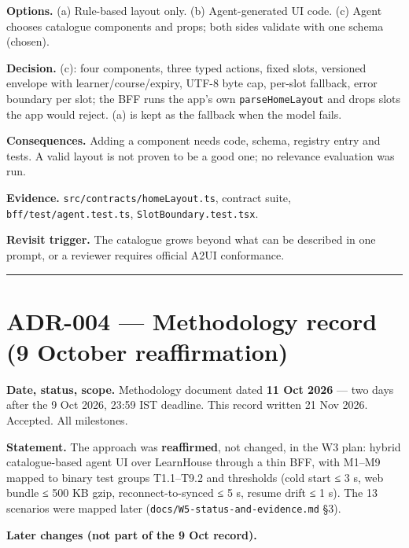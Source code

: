 \documentclass[
  11pt,
]{article}
\begin{document}
\textbf{Options.} (a) Rule-based layout only. (b) Agent-generated UI
code. (c) Agent chooses catalogue components and props; both sides
validate with one schema (chosen).

\textbf{Decision.} (c): four components, three typed actions, fixed
slots, versioned envelope with learner/course/expiry, UTF-8 byte cap,
per-slot fallback, error boundary per slot; the BFF runs the app's own
\texttt{parseHomeLayout} and drops slots the app would reject. (a) is
kept as the fallback when the model fails.

\textbf{Consequences.} Adding a component needs code, schema, registry
entry and tests. A valid layout is not proven to be a good one; no
relevance evaluation was run.

\textbf{Evidence.} \texttt{src/contracts/homeLayout.ts}, contract suite,
\texttt{bff/test/agent.test.ts}, \texttt{SlotBoundary.test.tsx}.

\textbf{Revisit trigger.} The catalogue grows beyond what can be
described in one prompt, or a reviewer requires official A2UI
conformance.

\begin{center}\rule{0.5\linewidth}{0.5pt}\end{center}

\hypertarget{adr-004-methodology-record-9-october-reaffirmation}{%
\section{ADR-004 --- Methodology record (9 October
reaffirmation)}\label{adr-004-methodology-record-9-october-reaffirmation}}

\textbf{Date, status, scope.} Methodology document dated \textbf{11 Oct
2026} --- two days after the 9 Oct 2026, 23:59 IST deadline. This record
written 21 Nov 2026. Accepted. All milestones.

\textbf{Statement.} The approach was \textbf{reaffirmed}, not changed,
in the W3 plan: hybrid catalogue-based agent UI over LearnHouse through
a thin BFF, with M1--M9 mapped to binary test groups T1.1--T9.2 and
thresholds (cold start ≤ 3 s, web bundle ≤ 500 KB gzip,
reconnect-to-synced ≤ 5 s, resume drift ≤ 1 s). The 13 scenarios were
mapped later (\texttt{docs/W5-status-and-evidence.md} §3).

\textbf{Later changes (not part of the 9 Oct record).}
\end{document}

